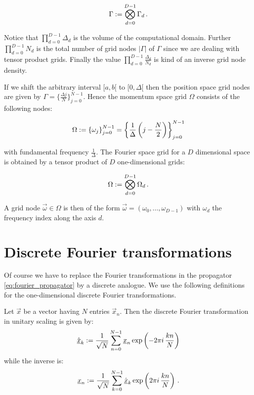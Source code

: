 \begin{equation}
  \Gamma := \bigotimes_{d=0}^{D-1} \Gamma_d \,.
\end{equation}

Notice that $\prod_{d=0}^{D-1} \Delta_d$ is the volume of the computational domain.
Further $\prod_{d=0}^{D-1} N_d$ is the total number of grid  nodes $|\Gamma|$
of $\Gamma$ since we are dealing with tensor product grids. Finally the value
$\prod_{d=0}^{D-1} \frac{\Delta_d}{N_d}$ is kind of an inverse grid node density.

If we shift the arbitrary interval $[a, b[$ to $[0, \Delta[$ then the position
space grid nodes are given by $\Gamma = \{\frac{\Delta j}{N}\}_{j=0}^{N-1}$.
Hence the momentum space grid $\Omega$ consists of the following nodes:

\begin{equation}
  \Omega := \left\{ \omega_j \right\}_{j=0}^{N-1} =
  \left\{ \frac{1}{\Delta} \left(j-\frac{N}{2}\right) \right\}_{j=0}^{N-1}
\end{equation}

with fundamental frequency $\frac{1}{\Delta}$. The Fourier space grid for
a $D$ dimensional space is obtained by a tensor product of $D$ one-dimensional
grids:

\begin{equation}
  \Omega := \bigotimes_{d=0}^{D-1} \Omega_d \,.
\end{equation}

A grid node $\vec{\omega} \in \Omega$ is then of the form $\vec{\omega} = (\omega_0, \ldots, \omega_{D-1})$
with $\omega_d$ the frequency index along the axis $d$.


\section{Discrete Fourier transformations}


Of course we have to replace the Fourier transformations in the propagator \eqref{eq:fourier_propagator}
by a discrete analogue. We use the following definitions for the one-dimensional
discrete Fourier transformations.

\begin{definition}
  Let $\vec{x}$ be a vector having $N$ entries $\vec{x}_n$. Then the discrete
  Fourier transformation in unitary scaling is given by:
  \begin{equation*}
    \hat{\underline{x}}_k := \frac{1}{\sqrt{N}} \sum_{n=0}^{N-1} \underline{x}_n \exp\left(-2\pi i \, \frac{k n}{N}\right)
  \end{equation*}
  while the inverse is:
  \begin{equation*}
    \underline{x}_n := \frac{1}{\sqrt{N}} \sum_{k=0}^{N-1} \hat{\underline{x}}_k \exp\left(2\pi i \, \frac{k n}{N}\right) \,.
  \end{equation*}
\end{definition}

